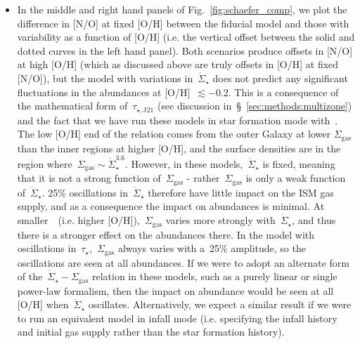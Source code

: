 \documentclass[ms.tex]{subfiles}
\begin{document}
\begin{itemize}
	\item In the middle and right hand panels of Fig.~\ref{fig:schaefer_comp}, 
	we plot the difference in [N/O] at fixed [O/H] between the fiducial model 
	and those with variability as a function of [O/H] (i.e. the vertical 
	offset between the solid and dotted curves in the left hand panel). 
	Both scenarios produce offsets in [N/O] at high [O/H] (which as discussed 
	above are truly offsets in [O/H] at fixed [N/O]), but the model with 
	variations in~$\dot{\Sigma}_\star$ does not predict any significant 
	fluctuations in the abundances at [O/H]~$\lesssim -0.2$. 
	This is a consequence of the mathematical form of~$\tau_{\star,\text{J21}}$ 
	(see discussion in~\S~\ref{sec:methods:multizone}) and the fact that we 
	have run these models in star formation mode with~\vice. 
	The low [O/H] end of the relation comes from the outer Galaxy at lower 
	$\Sigma_\text{gas}$ than the inner regions at higher [O/H], and the surface 
	densities are in the region where~$\Sigma_\text{gas} 
	\sim \dot{\Sigma}_\star^{3.6}$. 
	However, in these models,~$\dot{\Sigma}_\star$ is fixed, meaning that it is 
	not a strong function of~$\Sigma_\text{gas}$ - rather~$\Sigma_\text{gas}$ 
	is only a weak function of~$\dot{\Sigma}_\star$. 
	25\% oscillations in~$\dot{\Sigma}_\star$ therefore have little impact on 
	the ISM gas supply, and as a consequence the impact on abundances is 
	minimal. 
	At smaller~\rgal~(i.e. higher [O/H]),~$\Sigma_\text{gas}$ varies more 
	strongly with~$\dot{\Sigma}_\star$, and thus there is a stronger effect on 
	the abundances there. 
	In the model with oscillations in~$\tau_\star$,~$\Sigma_\text{gas}$ always 
	varies with a~25\% amplitude, so the oscillations are seen at all 
	abundances. 
	If we were to adopt an alternate form of the~$\dot{\Sigma}_\star - 
	\Sigma_\text{gas}$ relation in these models, such as a purely linear or 
	single power-law formalism, then the impact on abundance would be seen at 
	all [O/H] when~$\dot{\Sigma}_\star$ oscillates. 
	Alternatively, we expect a similar result if we were to run an equivalent 
	model in infall mode (i.e. specifying the infall history and initial gas 
	supply rather than the star formation history). 


\end{itemize}
\end{document}
